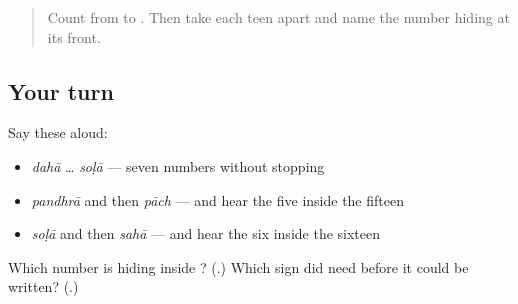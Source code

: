 \label{lesson:MR-R57-thirteen-to-sixteen}



\begin{quote}
Count from \textbf{} to \textbf{}. Then take each teen apart and name the number hiding at its front.
\end{quote}

\subsection*{Your turn}
Say these aloud:

\begin{itemize}
\raggedright
  \item \emph{dahā} … \emph{soḷā} — seven numbers without stopping
  \item \emph{pandhrā} and then \emph{pāch} — and hear the five inside the fifteen
  \item \emph{soḷā} and then \emph{sahā} — and hear the six inside the sixteen
\end{itemize}

\begin{tcolorbox}[breakable,colback=teal!4,colframe=teal!35!black,title={Before you move on}]
Which number is hiding inside \textbf{}? (\textbf{}.) Which sign did \textbf{} need before it could be written? (\textbf{}.)
\end{tcolorbox}
